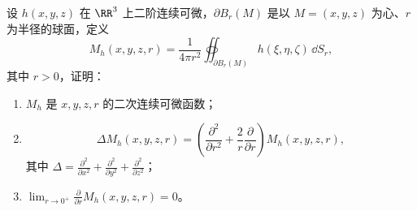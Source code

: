 \begin{xexample}[26.2.2]
设 $h(x,y,z)$ 在 $\RR^3$ 上二阶连续可微，$\partial B_r(M)$ 是以 $M=(x,y,z)$ 为心、$r$ 为半径的球面，定义
\[
  M_h(x,y,z,r)=\frac{1}{4\pi r^2}\oiint_{\partial B_r(M)}h(\xi,\eta,\zeta)\,\dd S_r,
\]
其中 $r>0$，证明：
\begin{enumerate}[label=(\arabic*)]
  \item $M_h$ 是 $x,y,z,r$ 的二次连续可微函数；
  \item
  \[
    \Delta M_h(x,y,z,r)
    =\left(\frac{\partial^2}{\partial r^2}+\frac{2}{r}\frac{\partial}{\partial r}\right)M_h(x,y,z,r),
  \]
  其中 $\displaystyle\Delta=\frac{\partial^2}{\partial x^2}+\frac{\partial^2}{\partial y^2}+\frac{\partial^2}{\partial z^2}$；
  \item $\displaystyle\lim_{r\to0^+}\frac{\partial}{\partial r}M_h(x,y,z,r)=0$。
\end{enumerate}
\end{xexample}
